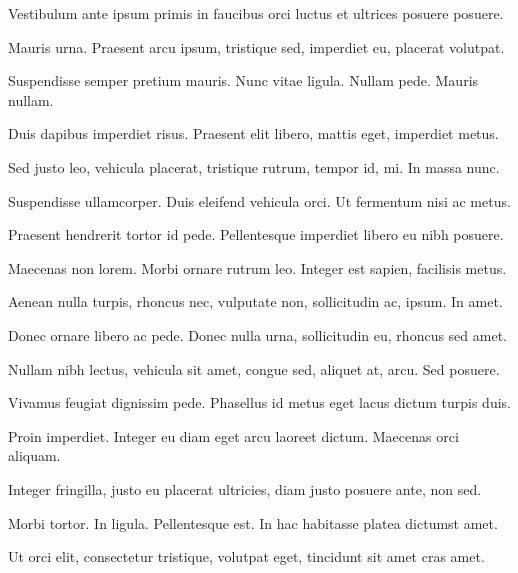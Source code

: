 \documentclass[letterpaper,10pt]{resume}
\begin{document}
        \endplace
            \begin{items}
                \item Vestibulum ante ipsum primis in faucibus orci luctus et ultrices posuere posuere.
                \item Mauris urna. Praesent arcu ipsum, tristique sed, imperdiet eu, placerat volutpat.
                \item Suspendisse semper pretium mauris. Nunc vitae ligula. Nullam pede. Mauris nullam.
                \item Duis dapibus imperdiet risus. Praesent elit libero, mattis eget, imperdiet metus.
                \item Sed justo leo, vehicula placerat, tristique rutrum, tempor id, mi. In massa nunc.
                \item Suspendisse ullamcorper. Duis eleifend vehicula orci. Ut fermentum nisi ac metus.
                \item Praesent hendrerit tortor id pede. Pellentesque imperdiet libero eu nibh posuere.
                \item Maecenas non lorem. Morbi ornare rutrum leo. Integer est sapien, facilisis metus.
                \item Aenean nulla turpis, rhoncus nec, vulputate non, sollicitudin ac, ipsum. In amet.
                \item Donec ornare libero ac pede. Donec nulla urna, sollicitudin eu, rhoncus sed amet.
                \item Nullam nibh lectus, vehicula sit amet, congue sed, aliquet at, arcu. Sed posuere.
                \item Vivamus feugiat dignissim pede. Phasellus id metus eget lacus dictum turpis duis.
                \item Proin imperdiet. Integer eu diam eget arcu laoreet dictum. Maecenas orci aliquam.
                \item Integer fringilla, justo eu placerat ultricies, diam justo posuere ante, non sed.
                \item Morbi tortor. In ligula. Pellentesque est. In hac habitasse platea dictumst amet.
                \item Ut orci elit, consectetur tristique, volutpat eget, tincidunt sit amet cras amet.
            \end{items}
        \endplace
    \endsection
\end{document}
